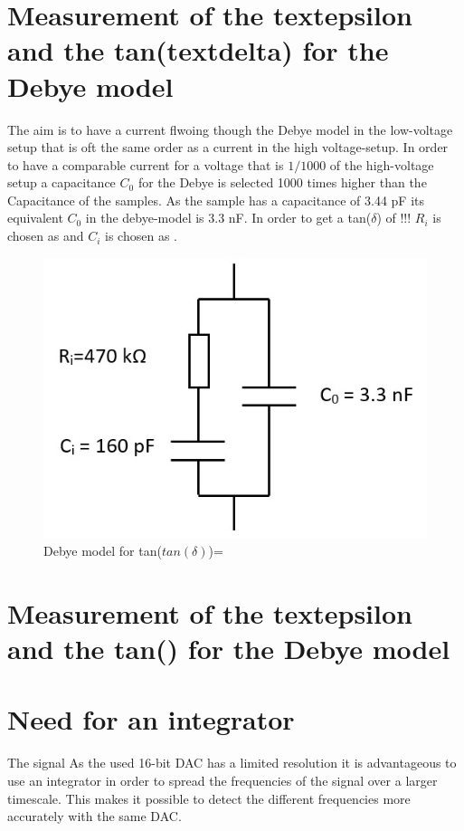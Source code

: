 \section{Measurement of the textepsilon and the tan(textdelta) for the Debye model}

The aim is to have a current flwoing though the Debye model in the low-voltage setup that is oft the same order as a current in the high voltage-setup. In order to have a comparable current for a voltage that is $1/1000$ of the high-voltage setup a capacitance $C_0$ for the Debye is selected 1000 times higher than the Capacitance of the samples. As the sample has a capacitance of 3.44 pF its equivalent $C_0$ in the debye-model is 3.3 nF. In order to get a tan($\delta$) of !!! $R_i$ is chosen as and $C_i$ is chosen as .
\begin{figure}
	\includegraphics{figures/Methods/debye-modell.jpg}	
	\caption{Debye model for tan($tan(\delta)$)= }	
\end{figure}


\section{Measurement of the textepsilon and the tan(\textdelta) for the Debye model}




\section{Need for an integrator}
The signal 
As the used 16-bit DAC has a limited resolution it is advantageous to use an integrator in order to spread the frequencies of the signal over a larger timescale. This makes it possible to detect the different frequencies more accurately with the same DAC. 
\newpage

